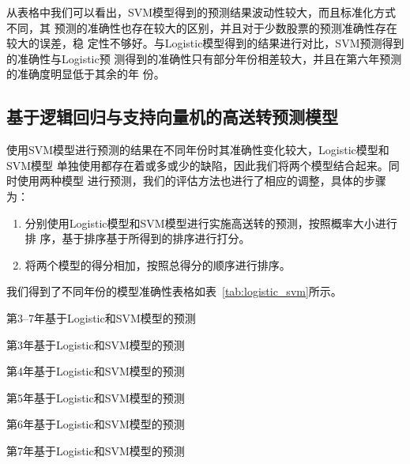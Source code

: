 \documentclass[../main]{subfiles}
\begin{document}
从表格中我们可以看出，SVM模型得到的预测结果波动性较大，而且标准化方式不同，其
预测的准确性也存在较大的区别，并且对于少数股票的预测准确性存在较大的误差，稳
定性不够好。与Logistic模型得到的结果进行对比，SVM预测得到的准确性与Logistic预
测得到的准确性只有部分年份相差较大，并且在第六年预测的准确度明显低于其余的年
份。

\subsection{基于逻辑回归与支持向量机的高送转预测模型}%
\label{sub:logistic_svm}

使用SVM模型进行预测的结果在不同年份时其准确性变化较大，Logistic模型和SVM模型
单独使用都存在着或多或少的缺陷，因此我们将两个模型结合起来。同时使用两种模型
进行预测，我们的评估方法也进行了相应的调整，具体的步骤为：

\begin{enumerate}
  \item 分别使用Logistic模型和SVM模型进行实施高送转的预测，按照概率大小进行排
    序，基于排序基于所得到的排序进行打分。
  \item 将两个模型的得分相加，按照总得分的顺序进行排序。
\end{enumerate}

我们得到了不同年份的模型准确性表格如表~\ref{tab:logistic_svm}所示。

\begin{table}[htpb]
  \centering
  \caption{第3--7年基于Logistic和SVM模型的预测}%
  \label{tab:logistic_svm}
  \setlength\tabcolsep{2pt}
  \begin{subtable}[htbp]{0.45\linewidth}
    \centering
    \caption{第3年基于Logistic和SVM模型的预测}%
    \label{tab:logistic_svm3}
  \end{subtable}
  \qquad
  \begin{subtable}[htbp]{0.45\linewidth}
    \centering
    \caption{第4年基于Logistic和SVM模型的预测}%
    \label{tab:logistic_svm4}
  \end{subtable}

  \begin{subtable}[htbp]{0.45\linewidth}
    \centering
    \caption{第5年基于Logistic和SVM模型的预测}%
    \label{tab:logistic_svm5}
  \end{subtable}
  \qquad
  \begin{subtable}[htbp]{0.45\linewidth}
    \centering
    \caption{第6年基于Logistic和SVM模型的预测}%
    \label{tab:logistic_svm6}
  \end{subtable}

  \begin{subtable}[htbp]{0.45\linewidth}
    \centering
    \caption{第7年基于Logistic和SVM模型的预测}%
    \label{tab:logistic_svm7}
  \end{subtable}
\end{table}
\end{document}
